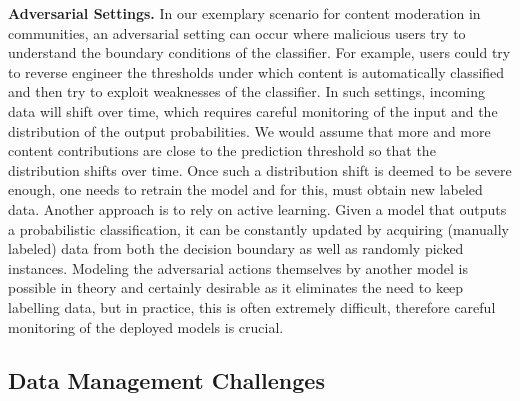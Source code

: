 \documentclass[11pt]{article}
\newcommand{\hdr}[1]{\noindent\textbf{#1.}}
\begin{document}
\hdr{Adversarial Settings} In our exemplary scenario for content moderation in communities, an adversarial setting can occur where malicious users try to understand the boundary conditions of the classifier. For example, users could try to reverse engineer the thresholds under which content is automatically classified and then try to exploit weaknesses of the classifier. In such settings, incoming data will shift over time, which requires careful monitoring of the input and the distribution of the output probabilities. We would assume that more and more content contributions are close to the prediction threshold so that the distribution shifts over time. Once such a distribution shift is deemed to be severe enough, one needs to retrain the model and for this, must obtain new labeled data. Another approach is to rely on active learning. Given a model that outputs a probabilistic classification, it can be constantly updated by acquiring (manually labeled) data from both the decision boundary as well as randomly picked instances. Modeling the adversarial actions themselves by another model is possible in theory and certainly desirable as it eliminates the need to keep labelling data, but in practice, this is often extremely difficult, therefore careful monitoring of the deployed models is crucial.\\


\subsection{Data Management Challenges}
\label{sec:datamanagement}
\end{document}
